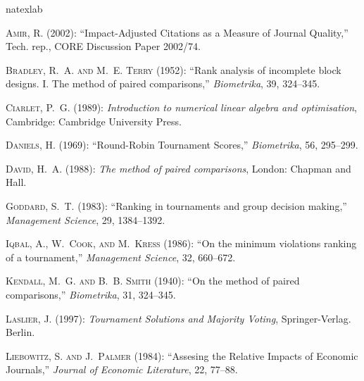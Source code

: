 \documentclass[a4paper,10pt]{article}
\theoremstyle{remark}
\begin{document}
\begin{thebibliography}{16}
\newcommand{\enquote}[1]{``#1''}
\expandafter\ifx\csname natexlab\endcsname\relax\def\natexlab#1{#1}\fi

\textsc{Amir, R.} (2002): \enquote{Impact-Adjusted Citations as a Measure of
  Journal Quality,} Tech. rep., CORE Discussion Paper 2002/74.

\textsc{Bradley, R.~A. and M.~E. Terry} (1952): \enquote{Rank analysis of
  incomplete block designs. I. The method of paired comparisons,}
  \emph{Biometrika}, 39, 324--345.

\textsc{Ciarlet, P.~G.} (1989): \emph{Introduction to numerical linear algebra
  and optimisation}, Cambridge: Cambridge University Press.

\textsc{Daniels, H.} (1969): \enquote{Round-Robin Tournament Scores,}
  \emph{Biometrika}, 56, 295--299.

\textsc{David, H.~A.} (1988): \emph{The method of paired comparisons}, London:
  Chapman and Hall.

\textsc{Goddard, S.~T.} (1983): \enquote{Ranking in tournaments and group
  decision making,} \emph{Management Science}, 29, 1384--1392.

\textsc{Iqbal, A., W.~Cook, and M.~Kress} (1986): \enquote{On the minimum
  violations ranking of a tournament,} \emph{Management Science}, 32, 660--672.

\textsc{Kendall, M.~G. and B.~B. Smith} (1940): \enquote{On the method of
  paired comparisons,} \emph{Biometrika}, 31, 324--345.

\textsc{Laslier, J.} (1997): \emph{Tournament Solutions and Majority Voting},
  Springer-Verlag. Berlin.

\textsc{Liebowitz, S. and J.~Palmer} (1984): \enquote{Assesing the Relative
  Impacts of Economic Journals,} \emph{Journal of Economic Literature}, 22,
  77--88.


\end{thebibliography}
\end{document}
